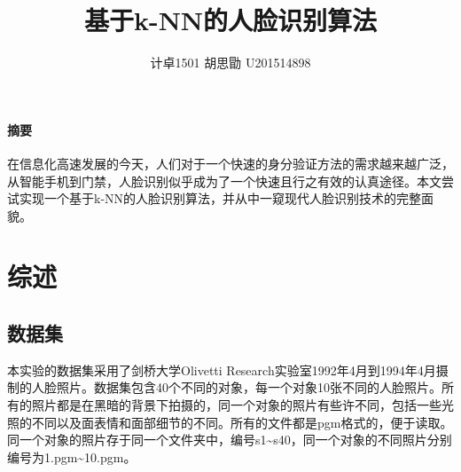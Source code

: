 \documentclass{article}
\title{基于k-NN的人脸识别算法}
\author{计卓1501 胡思勖 U201514898}
\begin{document}
\maketitle

\paragraph{摘要}
\label{par:zhai_yao_}
\par 在信息化高速发展的今天，人们对于一个快速的身分验证方法的需求越来越广泛，从智能手机到门禁，人脸识别似乎成为了一个快速且行之有效的认真途径。本文尝试实现一个基于k-NN的人脸识别算法，并从中一窥现代人脸识别技术的完整面貌。

\section{综述}
\label{sec:zong_shu_}

\subsection{数据集}
\label{sub:shu_ju_ji_}
\par 本实验的数据集采用了剑桥大学Olivetti Research实验室1992年4月到1994年4月摄制的人脸照片。数据集包含40个不同的对象，每一个对象10张不同的人脸照片。所有的照片都是在黑暗的背景下拍摄的，同一个对象的照片有些许不同，包括一些光照的不同以及面表情和面部细节的不同。所有的文件都是pgm格式的，便于读取。同一个对象的照片存于同一个文件夹中，编号s1\textasciitilde s40，同一个对象的不同照片分别编号为1.pgm\textasciitilde 10.pgm。
\end{document}
